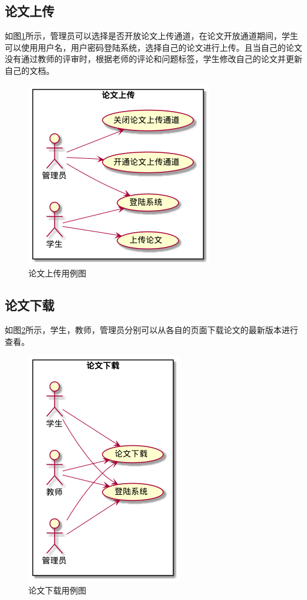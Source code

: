 \subsection{论文上传}

如图\ref{upload-usecase}所示，管理员可以选择是否开放论文上传通道，在论文开放通道期间，学生可以使用用户名，用户密码登陆系统，选择自己的论文进行上传。且当自己的论文没有通过教师的评审时，根据老师的评论和问题标签，学生修改自己的论文并更新自己的文档。

\begin{figure}[htbp]
    \centering
    \includegraphics[scale = 0.6]{out/uml/用例图/2-论文上传/2-论文上传.png}
    \caption{\song\wuhao 论文上传用例图}
    \label{upload-usecase}
\end{figure}

\subsection{论文下载}

如图\ref{download-usecase}所示，学生，教师，管理员分别可以从各自的页面下载论文的最新版本进行查看。

\begin{figure}[htbp]
    \centering
    \includegraphics[scale = 0.6]{out/uml/用例图/5-论文下载/5-论文下载.png}
    \caption{\song\wuhao 论文下载用例图}
    \label{download-usecase}
\end{figure}

